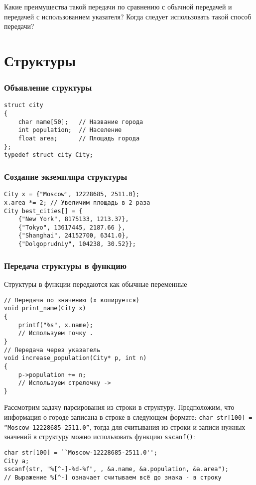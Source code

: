 \documentclass{article}
\begin{document}
\textbf{\Circpipe} Какие преимущества такой передачи по сравнению с обычной передачей и передачей с использованием указателя? Когда следует использовать такой способ передачи?
\newpage

\section*{Структуры}
\setlength{\columnsep}{1.5cm}
\setlength{\columnseprule}{0.2pt}
\begin{multicols}{2}
\subsubsection*{Объявление структуры}
\begin{lstlisting}
struct city
{
    char name[50];   // Название города
    int population;  // Население
    float area;      // Площадь города
};
typedef struct city City;   
\end{lstlisting}

\subsubsection*{Создание экземпляра структуры}
\begin{lstlisting}
City x = {"Moscow", 12228685, 2511.0};
x.area *= 2; // Увеличим площадь в 2 раза
City best_cities[] = {
    {"New York", 8175133, 1213.37},
    {"Tokyo", 13617445, 2187.66 },
    {"Shanghai", 24152700, 6341.0},
    {"Dolgoprudniy", 104238, 30.52}};
\end{lstlisting}
\subsubsection*{Передача структуры в функцию}
Структуры в функции передаются как обычные переменные
\begin{lstlisting}
// Передача по значению (x копируется)
void print_name(City x)
{
    printf("%s", x.name);
    // Используем точку .
}
// Передача через указатель
void increase_population(City* p, int n)
{
    p->population += n;
    // Используем стрелочку ->
}
\end{lstlisting}
\end{multicols}
Рассмотрим задачу парсирования из строки в структуру. Предположим, что информация о городе записана в строке в следующем формате: \texttt{char str[100] = ``Moscow-12228685-2511.0''}, тогда для считывания из строки и записи нужных значений в структуру можно использовать функцию \texttt{sscanf()}: 
\begin{lstlisting}
char str[100] = ``Moscow-12228685-2511.0'';
City a;
sscanf(str, "%[^-]-%d-%f", , &a.name, &a.population, &a.area");
// Выражение %[^-] означает считываем всё до знака - в строку
\end{lstlisting}
\end{document}
